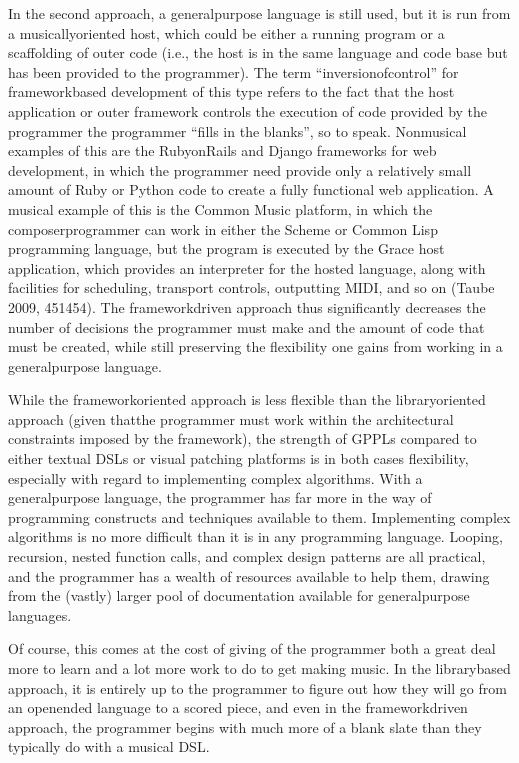 \documentclass[letterpaper,10pt,english]{sphinxmanual}
\begin{document}
\sphinxAtStartPar
In the second approach, a general\sphinxhyphen{}purpose language is still used,
but it is run from a musically\sphinxhyphen{}oriented host, which could be either
a running program or a scaffolding of outer code (i.e., the host
is in the same language and code base but has been provided to the programmer).
The term “inversion\sphinxhyphen{}of\sphinxhyphen{}control” for framework\sphinxhyphen{}based development of this type refers to the fact
that the host application or outer framework controls the execution of
code provided by the programmer \sphinxhyphen{} the programmer “fills in the blanks”, so to speak.
Non\sphinxhyphen{}musical examples of this are the Ruby\sphinxhyphen{}on\sphinxhyphen{}Rails and Django frameworks for web development,
in which the programmer need provide only a relatively small amount of Ruby or Python
code to create a fully functional web application.
A musical example of this is the Common Music platform, in which
the composer\sphinxhyphen{}programmer can work in either the Scheme or Common Lisp programming language,
but the program is executed by the Grace host application, which
provides an interpreter for the hosted language, along
with facilities for scheduling, transport controls, outputting MIDI, and so on (Taube 2009, 451\sphinxhyphen{}454).
The framework\sphinxhyphen{}driven approach thus significantly decreases the number
of decisions the programmer must make and the amount of code that
must be created, while still preserving the flexibility one gains from
working in a general\sphinxhyphen{}purpose language.

\sphinxAtStartPar
While the framework\sphinxhyphen{}oriented approach is less flexible than the
library\sphinxhyphen{}oriented approach (given thatthe programmer must work within the architectural
constraints imposed by the framework), the strength of GPPLs compared to either
textual DSLs or visual patching platforms is in both cases flexibility, especially with
regard to implementing complex algorithms.
With a general\sphinxhyphen{}purpose language, the programmer has far more in the way
of programming constructs and techniques available to them.
Implementing complex algorithms is no more difficult than it is in any
programming language. Looping, recursion, nested function calls, and complex
design patterns are all practical, and the programmer has a wealth of resources
available to help them, drawing from the (vastly) larger pool of documentation
available for general\sphinxhyphen{}purpose languages.

\sphinxAtStartPar
Of course, this comes at the cost of giving of the programmer both a great deal more
to learn and a lot more work to do to get making music.
In the library\sphinxhyphen{}based approach, it is entirely up to the programmer to figure out
how they will go from an open\sphinxhyphen{}ended language to a scored piece,
and even in the framework\sphinxhyphen{}driven approach, the programmer begins with
much more of a blank slate than they typically do with a musical DSL.
\end{document}
